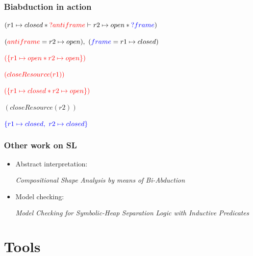 \documentclass{beamer}
\begin{document}
    \begin{frame}
        \frametitle{Biabduction in action}
        $(r1\mapsto closed \ast \textcolor{red}{?antiframe} \vdash r2 \mapsto open \ast \textcolor{blue}{?frame})$
        \small

        \bigskip
        \pause
        $(\textcolor{red}{antiframe} = r2 \mapsto open),\ (\textcolor{blue}{frame}=r1 \mapsto closed)$

        \bigskip
        \pause
        
        $\textcolor{red}{(\{r1 \mapsto open \ast r2 \mapsto open\})}$
        
        $\textcolor{red}{(closeResource(r1))}$
        
        $\textcolor{red}{(\{r1 \mapsto closed \ast r2 \mapsto open\})}$
        
        $(closeResource(r2))$

        $\textcolor{blue}{\{r1 \mapsto closed,\ r2 \mapsto closed\}}$

    \end{frame}

    \begin{frame}
        \frametitle{Other work on SL}

        \begin{itemize}
            \item Abstract interpretation:
            
            \medskip
            \emph{Compositional Shape Analysis by means of Bi-Abduction} \cite{calcagno2009compositional}

            \bigskip
            \item  Model checking:
            
            \medskip
            \emph{Model Checking for Symbolic-Heap Separation Logic with
Inductive Predicates} \cite{modelchecking}
        \end{itemize}
    \end{frame}
    \section{Tools} 
    
\end{document}
